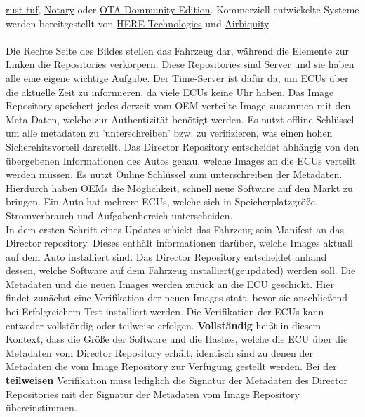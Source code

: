 \hyperlink{https://github.com/heartsucker/rust-tuf}{rust-tuf},
\hyperlink{https://github.com/theupdateframework/notary}{Notary} oder 
\hyperlink{https://github.com/advancedtelematic/ota-community-edition/}{OTA Dommunity Edition}.
Kommerziell entwickelte Systeme werden bereitgestellt von \hyperlink{https://www.here.com/products/automotive/ota-technology}{HERE Technologies} und 
\hyperlink{https://www.airbiquity.com/product-offerings/software-and-data-management}{Airbiquity}.\\\\
Die Rechte Seite des Bildes stellen das Fahrzeug dar, während die Elemente zur Linken die Repositories verkörpern. Diese Repositories sind Server und sie haben alle eine eigene wichtige Aufgabe.  Der Time-Server ist dafür da, um ECUs über die aktuelle Zeit zu informieren, da viele ECUs  keine Uhr haben. Das Image Repository speichert jedes derzeit vom OEM verteilte Image zusammen mit den Meta-Daten, welche zur Authentizität benötigt werden. Es nutzt offline Schlüssel um alle metadaten zu 'unterschreiben' bzw. zu verifizieren, was einen hohen Sicherehitsvorteil darstellt. Das Director Repository entscheidet abhängig von den übergebenen Informationen des Autos genau, welche Images an die ECUs verteilt werden müssen. Es nutzt Online Schlüssel zum unterschreiben der Metadaten. Hierdurch haben OEMs die Möglichkeit, schnell neue Software auf den Markt zu bringen. Ein Auto hat mehrere ECUs, welche sich in Speicherplatzgröße, Stromverbrauch und Aufgabenbereich unterscheiden.\\

In dem ersten Schritt eines Updates schickt das Fahrzeug sein Manifest an das Director repository. Dieses enthält informationen darüber, welche Images aktuall auf dem Auto installiert sind. Das Director Repository entscheidet anhand dessen, welche Software auf dem Fahrzeug installiert(geupdated) werden soll. Die Metadaten und die neuen Images werden zurück an die ECU geschickt. Hier findet zunächst eine Verifikation der neuen Images statt, bevor sie anschließend bei Erfolgreichem Test installiert werden. Die Verifikation der ECUs kann entweder vollstöndig oder teilweise erfolgen. \textbf{Vollständig }heißt in diesem Kontext, dass die Größe der Software und die Hashes, welche die ECU über die Metadaten vom Director Repository erhält, identisch sind zu denen
der Metadaten die vom Image Repository zur Verfügung gestellt werden. Bei der \textbf{teilweisen} Verifikation  muss lediglich die Signatur der Metadaten des Director Repositories mit der Signatur der Metadaten vom Image Repository übereinstimmen.
